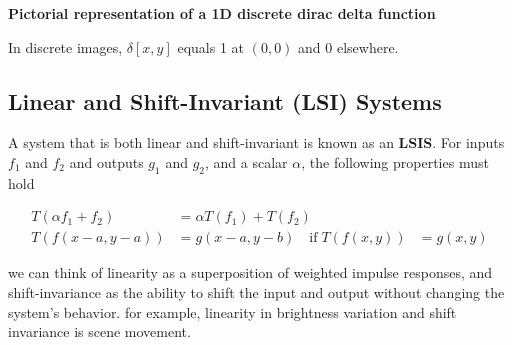 \noindent \textbf{Pictorial representation of a 1D discrete dirac delta function}
\begin{center}
\end{center}

In discrete images, \( \delta[x,y] \) equals 1 at \((0,0)\) and 0 elsewhere.

\subsection{Linear and Shift-Invariant (LSI) Systems}
A system that is both linear and shift-invariant is known as an \textbf{LSIS}. For inputs $f_1$ and $f_2$ and outputs \( g_1 \) and \( g_2 \), and a scalar \( \alpha \), the following properties must hold

\begin{align*}
T(\alpha f_1 + f_2) &= \alpha T(f_1) + T(f_2) \\
T(f(x-a,y-a)) &= g(x-a,y-b) \quad \text{if} \; T(f(x,y)) &= g(x,y)
\end{align*}  

we can think of linearity as a superposition of weighted impulse responses, and shift-invariance as the ability to shift the input and output without changing the system's behavior. for example, linearity in brightness variation and shift invariance is scene movement.

